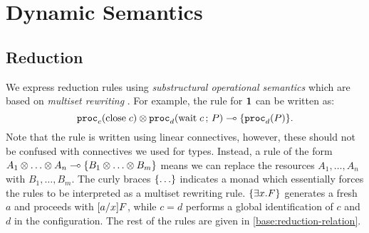 
\section{Dynamic Semantics}
\label{base:semantics}

\subsection{Reduction}

We express reduction rules using \emph{substructural operational semantics} \cite{Simmons12} which are based on \emph{multiset rewriting} \cite{CervesatoS09}. For example, the rule for $\mathbf{1}$ can be written as:
$$ \mathtt{proc}_{c}(\mathrm{close}\;c) \otimes \mathtt{proc}_{d}(\mathrm{wait}\;c \,;\, P) \multimap \lbrace\mathtt{proc}_{d}(P)\rbrace. $$
Note that the rule is written using linear connectives, however, these should not be confused with connectives we used for types. Instead, a rule of the form $A_1 \otimes \ldots \otimes A_n \multimap \lbrace B_1 \otimes \ldots \otimes B_m\rbrace$ means we can replace the resources $A_1, \ldots, A_n$ with $B_1, \ldots, B_m$. The curly braces $\lbrace\ldots\rbrace$ indicates a monad which essentially forces the rules to be interpreted as a multiset rewriting rule. $\lbrace\exists x. F\rbrace$ generates a fresh $a$ and proceeds with $\lbrack{a}/{x}\rbrack{F}$, while $c = d$ performs a global identification of $c$ and $d$ in the configuration. The rest of the rules are given in \cref{base:reduction-relation}.

